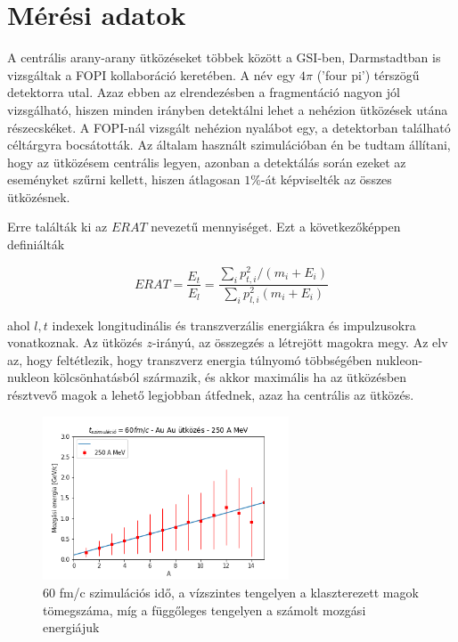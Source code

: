 \documentclass[a4paper,12pt]{article}
\begin{document}
\section{ Mérési adatok}

\par A centrális arany-arany ütközéseket többek között a GSI-ben, Darmstadtban is vizsgáltak a FOPI kollaboráció keretében. A név egy $4\pi$ ('four pi') térszögű detektorra utal. Azaz ebben az elrendezésben a fragmentáció nagyon jól vizsgálható, hiszen minden irányben detektálni lehet a nehézion ütközések utána részecskéket. A FOPI-nál vizsgált nehézion nyalábot egy, a detektorban található céltárgyra bocsátották. Az általam használt szimulációban én be tudtam állítani, hogy az ütközésem centrális legyen, azonban a detektálás során ezeket az eseményket szűrni kellett, hiszen átlagosan $1\%$-át képviselték az összes ütközésnek.

\par Erre találták ki az $ERAT$ nevezetű mennyiséget. Ezt a következőképpen definiálták

\begin{equation*}
ERAT = \frac{E_{t}}{E_{l}} = \frac{\sum_{i} p_{t,i}^{2}/(m_{i} + E_{i})}{\sum_{i} p_{l,i}^{2}(m_{i} + E_{i})}
\end{equation*}

\par ahol $l,t$ indexek longitudinális és transzverzális energiákra és impulzusokra vonatkoznak. Az ütközés $z$-irányú, az összegzés a létrejött magokra megy. Az elv az, hogy feltétlezik, hogy transzverz energia túlnyomó többségében nukleon-nukleon kölcsönhatásból származik, és akkor maximális ha az ütközésben résztvevő magok a lehető legjobban átfednek, azaz ha centrális az ütközés.

\begin{figure}[!htb]
\centering
\includegraphics[width=0.65\textwidth]{./60fmcAuAu250AMeV007mom.png}
\caption{60 fm/c szimulációs idő, a vízszintes tengelyen a klaszterezett magok tömegszáma, míg a függőleges tengelyen a számolt mozgási energiájuk}
\end{figure}
\end{document}
